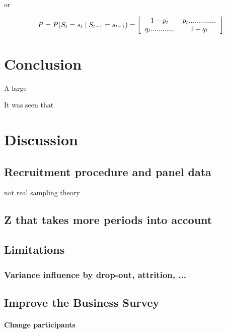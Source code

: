 \documentclass[12pt,a4paper,oneside]{book}
\begin{document}
or 

\begin{equation}
    P = P(S_t = s_t \mid S_{t-1} = s_{t-1}) = 
\left[ \begin{tabular}{c c}
            $1 - p_{t}$	& $p_{t} ..............$ \\ 
            $q_{t} ............$	& $1 - q_{t}$ \\ 
\end{tabular} \right]
\end{equation}






\chapter{Conclusion}

A large 

It was seen that


\chapter{Discussion}

\section{Recruitment procedure and panel data}
not real sampling theory



\section{Z that takes more periods into account}



\section{Limitations}

\subsection*{Variance influence by drop-out, attrition, ...}

\section{Improve the Business Survey}

\subsubsection*{Change participants}
\end{document}
